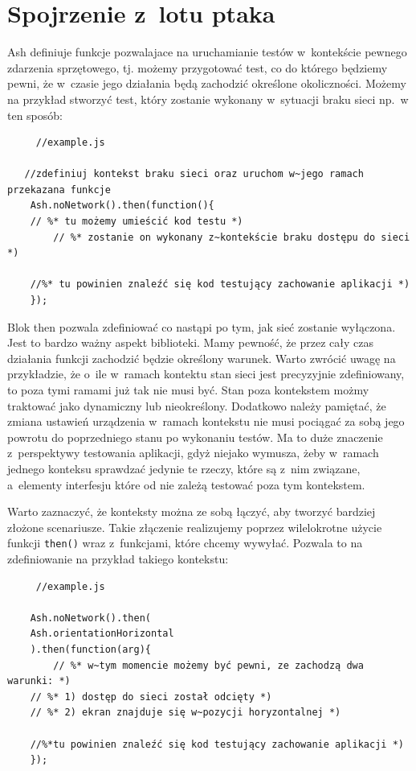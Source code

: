 \documentclass[brudnopis]{xmgr}
\begin{document}
\section{Spojrzenie z~lotu ptaka}

Ash definiuje funkcje pozwalajace na uruchamianie testów w~kontekście pewnego zdarzenia sprzętowego, tj. możemy przygotować test, co do którego będziemy pewni, że w~czasie jego działania będą zachodzić określone okoliczności. Możemy na przykład stworzyć test, który zostanie wykonany w~sytuacji braku sieci np.~w ten sposób:

\begin{lstlisting}
     //example.js

   //zdefiniuj kontekst braku sieci oraz uruchom w~jego ramach przekazana funkcje
    Ash.noNetwork().then(function(){
	// %* tu możemy umieścić kod testu *)
     	// %* zostanie on wykonany z~kontekście braku dostępu do sieci *)

	//%* tu powinien znaleźć się kod testujący zachowanie aplikacji *) 
    });
\end{lstlisting}

Blok then pozwala zdefiniować co nastąpi po tym, jak sieć zostanie wyłączona. Jest to bardzo ważny aspekt biblioteki. Mamy pewność, że przez cały czas działania funkcji zachodzić będzie określony warunek. Warto zwrócić uwagę na przykładzie, że o~ile w~ramach kontektu stan sieci jest precyzyjnie zdefiniowany, to poza tymi ramami już tak nie musi być. Stan poza kontekstem możmy traktować jako dynamiczny lub nieokreślony. Dodatkowo należy pamiętać, że zmiana ustawień urządzenia w~ramach kontekstu nie musi pociągać za sobą jego powrotu do poprzedniego stanu po wykonaniu testów. Ma to duże znaczenie z~perspektywy testowania aplikacji, gdyż niejako wymusza, żeby w~ramach jednego konteksu sprawdzać jedynie te rzeczy, które są z~nim związane, a~elementy interfesju które od nie zależą testować poza tym kontekstem.

Warto zaznaczyć, że konteksty można ze sobą łączyć, aby tworzyć bardziej złożone scenariusze. Takie złączenie realizujemy poprzez wilelokrotne użycie funkcji \texttt{then()} wraz z~funkcjami, które chcemy wywyłać. Pozwala to na zdefiniowanie na przykład takiego kontekstu:

\begin{lstlisting}
     //example.js

    Ash.noNetwork().then(
	Ash.orientationHorizontal
    ).then(function(arg){
      	// %* w~tym momencie możemy być pewni, ze zachodzą dwa warunki: *)
	// %* 1) dostęp do sieci został odcięty *) 
	// %* 2) ekran znajduje się w~pozycji horyzontalnej *)

	//%*tu powinien znaleźć się kod testujący zachowanie aplikacji *) 
    });
\end{lstlisting}
\end{document}
